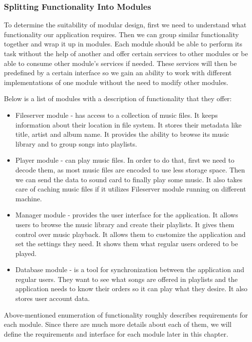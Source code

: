 \subsubsection{Splitting Functionality Into Modules}
To determine the suitability of modular design, first we need to understand what functionality our application requires. Then we can group similar functionality together and wrap it up in modules. Each module should be able to perform its task without the help of another and offer certain services to other modules or be able to consume other module's services if needed. These services will then be predefined by a certain interface so we gain an ability to work with different implementations of one module without the need to modify other modules.

\par
Below is a list of modules with a description of functionality that they offer:
\begin{itemize}
    \item Fileserver module - has access to a collection of music files. It keeps information about their location in file system. It stores their metadata like title, artist and album name. It provides the ability to browse its music library and to group songs into playlists.
    \item Player module - can play music files. In order to do that, first we need to decode them, as most music files are encoded to use less storage space. Then we can send the data to sound card to finally play some music. It also takes care of caching music files if it utilizes Fileserver module running on different machine.
    \item Manager module - provides the user interface for the application. It allows users to browse the music library and create their playlists. It gives them control over music playback. It allows them to customize the application and set the settings they need. It shows them what regular users ordered to be played.
    \item Database module - is a tool for synchronization between the application and regular users. They want to see what songs are offered in playlists and the application needs to know their orders so it can play what they desire. It also stores user account data.
\end{itemize}
Above-mentioned enumeration of functionality roughly describes requirements for each module. Since there are much more details about each of them, we will define the requirements and interface for each module later in this chapter.

